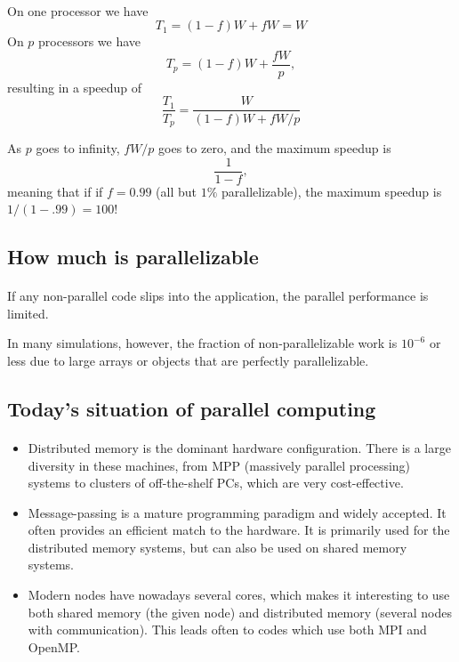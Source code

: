 \documentclass[%
oneside,                 %
final,                   %
10pt]{article}
\begin{document}
\paragraph{}
On one processor we have 
\[
T_1 = (1-f)W + fW = W
\]
On $p$ processors we have
\[
T_p = (1-f)W + \frac{fW}{p},
\]
resulting in a speedup of 
\[
\frac{T_1}{T_p} = \frac{W}{(1-f)W+fW/p}
\]

As $p$ goes to infinity, $fW/p$ goes to zero, and the maximum speedup is
\[
\frac{1}{1-f},
\]
meaning that if 
if $f = 0.99$ (all but $1\%$ parallelizable), the maximum speedup
is $1/(1-.99)=100$!



\subsection{How much is parallelizable}

\paragraph{}
If any non-parallel code slips into the
application, the parallel
performance is limited. 

In many simulations, however, the fraction of non-parallelizable work
is $10^{-6}$ or less due to large arrays or objects that are perfectly parallelizable.



\subsection{Today's situation of parallel computing}

\paragraph{}

\begin{itemize}
\item Distributed memory is the dominant hardware configuration. There is a large diversity in these machines, from  MPP (massively parallel processing) systems to clusters of off-the-shelf PCs, which are very cost-effective.

\item Message-passing is a mature programming paradigm and widely accepted. It often provides an efficient match to the hardware. It is primarily used for the distributed memory systems, but can also be used on shared memory systems.

\item Modern nodes have nowadays several cores, which makes it interesting to use both shared memory (the given node) and distributed memory (several nodes with communication). This leads often to codes which use both MPI and OpenMP.
\end{itemize}
\end{document}
